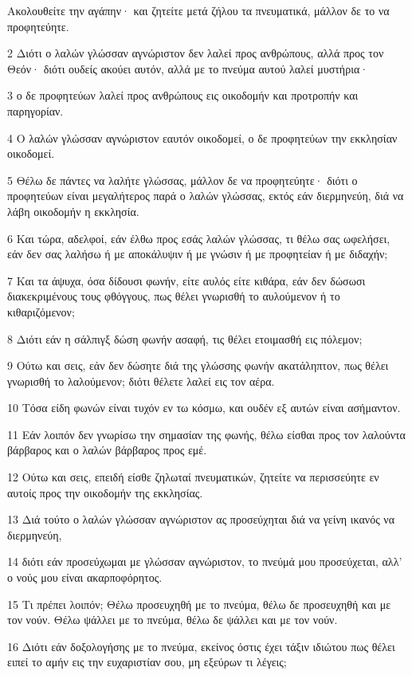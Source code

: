 \par Ακολουθείτε την αγάπην· και ζητείτε μετά ζήλου τα πνευματικά, μάλλον δε το να προφητεύητε.
\par 2 Διότι ο λαλών γλώσσαν αγνώριστον δεν λαλεί προς ανθρώπους, αλλά προς τον Θεόν· διότι ουδείς ακούει αυτόν, αλλά με το πνεύμα αυτού λαλεί μυστήρια·
\par 3 ο δε προφητεύων λαλεί προς ανθρώπους εις οικοδομήν και προτροπήν και παρηγορίαν.
\par 4 Ο λαλών γλώσσαν αγνώριστον εαυτόν οικοδομεί, ο δε προφητεύων την εκκλησίαν οικοδομεί.
\par 5 Θέλω δε πάντες να λαλήτε γλώσσας, μάλλον δε να προφητεύητε· διότι ο προφητεύων είναι μεγαλήτερος παρά ο λαλών γλώσσας, εκτός εάν διερμηνεύη, διά να λάβη οικοδομήν η εκκλησία.
\par 6 Και τώρα, αδελφοί, εάν έλθω προς εσάς λαλών γλώσσας, τι θέλω σας ωφελήσει, εάν δεν σας λαλήσω ή με αποκάλυψιν ή με γνώσιν ή με προφητείαν ή με διδαχήν;
\par 7 Και τα άψυχα, όσα δίδουσι φωνήν, είτε αυλός είτε κιθάρα, εάν δεν δώσωσι διακεκριμένους τους φθόγγους, πως θέλει γνωρισθή το αυλούμενον ή το κιθαριζόμενον;
\par 8 Διότι εάν η σάλπιγξ δώση φωνήν ασαφή, τις θέλει ετοιμασθή εις πόλεμον;
\par 9 Ούτω και σεις, εάν δεν δώσητε διά της γλώσσης φωνήν ακατάληπτον, πως θέλει γνωρισθή το λαλούμενον; διότι θέλετε λαλεί εις τον αέρα.
\par 10 Τόσα είδη φωνών είναι τυχόν εν τω κόσμω, και ουδέν εξ αυτών είναι ασήμαντον.
\par 11 Εάν λοιπόν δεν γνωρίσω την σημασίαν της φωνής, θέλω είσθαι προς τον λαλούντα βάρβαρος και ο λαλών βάρβαρος προς εμέ.
\par 12 Ούτω και σεις, επειδή είσθε ζηλωταί πνευματικών, ζητείτε να περισσεύητε εν αυτοίς προς την οικοδομήν της εκκλησίας.
\par 13 Διά τούτο ο λαλών γλώσσαν αγνώριστον ας προσεύχηται διά να γείνη ικανός να διερμηνεύη,
\par 14 διότι εάν προσεύχωμαι με γλώσσαν αγνώριστον, το πνεύμά μου προσεύχεται, αλλ' ο νούς μου είναι ακαρποφόρητος.
\par 15 Τι πρέπει λοιπόν; Θέλω προσευχηθή με το πνεύμα, θέλω δε προσευχηθή και με τον νούν. Θέλω ψάλλει με το πνεύμα, θέλω δε ψάλλει και με τον νούν.
\par 16 Διότι εάν δοξολογήσης με το πνεύμα, εκείνος όστις έχει τάξιν ιδιώτου πως θέλει ειπεί το αμήν εις την ευχαριστίαν σου, μη εξεύρων τι λέγεις;
